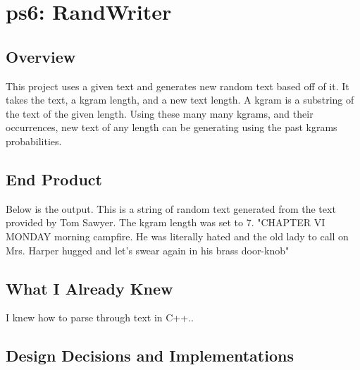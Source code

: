 \section{ps6: RandWriter}\label{sec:ps6}

\subsection{Overview}\label{sec:ps6:overview} %

This project uses a given text and generates new random text based off of it.
It takes the text, a kgram length, and a new text length.
A kgram is a substring of the text of the given length.
Using these many many kgrams, and their occurrences, new text of any length can be generating using the past kgrams probabilities.

\subsection{End Product}\label{sec:ps6:accomplish} %

Below is the output.
This is a string of random text generated from the text provided by Tom Sawyer.
The kgram length was set to 7.
\bigskip
"CHAPTER VI MONDAY morning campfire.
He was literally hated and the old lady to call on Mrs.
Harper hugged and let's swear again in his brass door-knob"

\subsection{What I Already Knew}\label{sec:ps6:knew} %

I knew how to parse through text in C++..

\subsection{Design Decisions and Implementations}\label{sec:ps6:decisions} %

